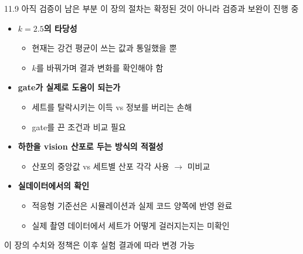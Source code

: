 \documentclass[aspectratio=169,11pt]{beamer}
\begin{document}
\begin{frame}{11.9 아직 검증이 남은 부분}
  이 장의 절차는 확정된 것이 아니라 검증과 보완이 진행 중
  \begin{itemize}
    \item \textbf{$k=2.5$의 타당성}
      \begin{itemize}
        \item 현재는 강건 평균이 쓰는 값과 통일했을 뿐
        \item $k$를 바꿔가며 결과 변화를 확인해야 함
      \end{itemize}
    \item \textbf{gate가 실제로 도움이 되는가}
      \begin{itemize}
        \item 세트를 탈락시키는 이득 vs 정보를 버리는 손해
        \item gate를 끈 조건과 비교 필요
      \end{itemize}
    \item \textbf{하한을 vision 산포로 두는 방식의 적절성}
      \begin{itemize}
        \item 산포의 중앙값 vs 세트별 산포 각각 사용 $\rightarrow$ 미비교
      \end{itemize}
    \item \textbf{실데이터에서의 확인}
      \begin{itemize}
        \item 적응형 기준선은 시뮬레이션과 실제 코드 양쪽에 반영 완료
        \item 실제 촬영 데이터에서 세트가 어떻게 걸러지는지는 미확인
      \end{itemize}
  \end{itemize}
  \vfill
  \centering 이 장의 수치와 정책은 이후 실험 결과에 따라 변경 가능
\end{frame}
\fi
\end{document}

